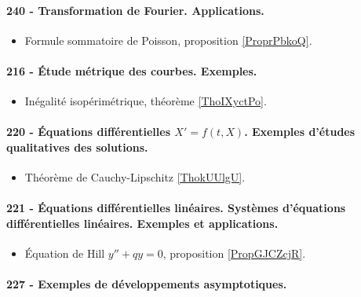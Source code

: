 \paragraph{240 - Transformation de Fourier. Applications.}
\begin{itemize}
    \item Formule sommatoire de Poisson, proposition \ref{ProprPbkoQ}.
\end{itemize}
\paragraph{216 - Étude métrique des courbes. Exemples.}
\begin{itemize}
    \item Inégalité isopérimétrique, théorème \ref{ThoIXyctPo}.
\end{itemize}
\paragraph{220 - Équations différentielles $X' = f (t , X )$. Exemples d’études qualitatives des solutions.}
\begin{itemize}
    \item Théorème de Cauchy-Lipschitz \ref{ThokUUlgU}.
\end{itemize}
\paragraph{221 - Équations différentielles linéaires. Systèmes d’équations différentielles linéaires. Exemples et applications.}
\begin{itemize}
    \item Équation de Hill \( y''+qy=0\), proposition \ref{PropGJCZcjR}.
\end{itemize}
\paragraph{227 - Exemples de développements asymptotiques.}

